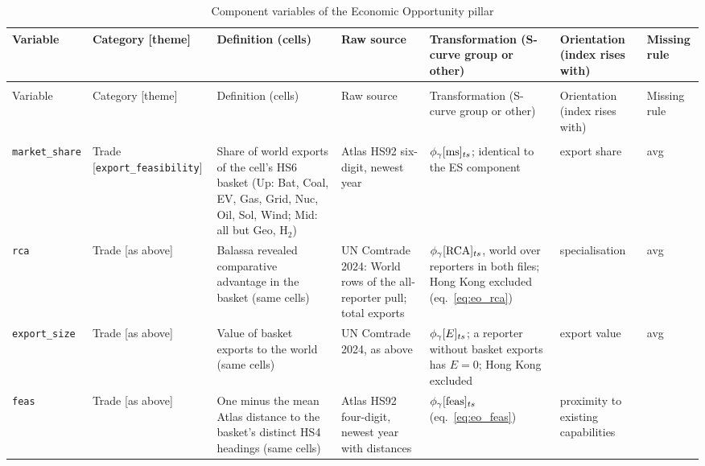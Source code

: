 \begin{landscape}
\scriptsize
\setlength{\tabcolsep}{3.5pt}
\renewcommand{\arraystretch}{1.1}
\begin{longtable}{@{}>{\raggedright\arraybackslash}p{2.7cm}
  >{\raggedright\arraybackslash}p{2.4cm}
  >{\raggedright\arraybackslash}p{5.3cm}
  >{\raggedright\arraybackslash}p{3.0cm}
  >{\raggedright\arraybackslash}p{4.7cm}
  >{\raggedright\arraybackslash}p{2.0cm}
  >{\raggedright\arraybackslash}p{1.1cm}@{}}
\caption{Component variables of the Economic Opportunity pillar}\label{tab:app_eo_variables}\\
\toprule
Variable & Category [theme] & Definition (cells) & Raw source & Transformation (S-curve group or
  other) & Orientation (index rises with) & Missing rule\\
\midrule
\endfirsthead
\multicolumn{7}{@{}l}{\textit{Table~\ref{tab:app_eo_variables} (continued)}}\\
\toprule
Variable & Category [theme] & Definition (cells) & Raw source & Transformation (S-curve group or
  other) & Orientation (index rises with) & Missing rule\\
\midrule
\endhead
\midrule
\multicolumn{7}{r@{}}{\textit{Continued on next page}}\\
\endfoot
\bottomrule
\endlastfoot
%
\texttt{market\_share} & Trade [\texttt{export\_\allowbreak feasibility}] &
  Share of world exports of the cell's HS6 basket (Up: Bat, Coal, EV, Gas, Grid, Nuc, Oil, Sol,
  Wind; Mid: all but Geo, H$_2$) &
  Atlas HS92 six-digit, newest year &
  $\phi_{\gamma}[\mathrm{ms}]_{ts}$; identical to the ES component & export share & avg\\
\texttt{rca} & Trade [as above] &
  Balassa revealed comparative advantage in the basket (same cells) &
  UN Comtrade 2024: World rows of the all-reporter pull; total exports &
  $\phi_{\gamma}[\mathrm{RCA}]_{ts}$, world over reporters in both files; Hong Kong excluded (eq.~\ref{eq:eo_rca}) &
  specialisation & avg\\
\texttt{export\_size} & Trade [as above] &
  Value of basket exports to the world (same cells) & UN Comtrade 2024, as above &
  $\phi_{\gamma}[E]_{ts}$; a reporter without basket exports has $E=0$; Hong Kong excluded & export
  value & avg\\
\texttt{feas} & Trade [as above] &
  One minus the mean Atlas distance to the basket's distinct HS4 headings (same cells) &
  Atlas HS92 four-digit, newest year with distances &
  $\phi_{\gamma}[\mathrm{feas}]_{ts}$ (eq.~\ref{eq:eo_feas}) & proximity to existing capabilities &

\end{longtable}
\end{landscape}
